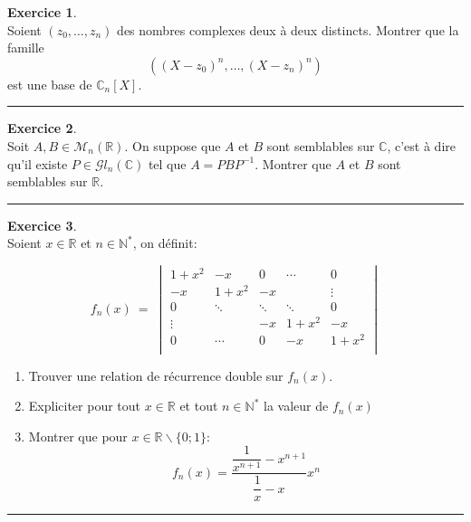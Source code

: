 \documentclass[a4paper,10pt]{article}
\theoremstyle{definition}
\theoremstyle{definition}
\newtheorem{exo}{Exercice}
\newcommand{\C}{\mathbb{C}}
\newcommand{\R}{\mathbb{R}}
\newcommand{\N}{\mathbb{N}}
\begin{document}
		\begin{exo}\quad\\[0.25cm]
			Soient $(z_0, \dots, z_n)$ des nombres complexes deux à deux distincts. Montrer que la famille 
			$$\left((X-z_0)^n, \dots , (X-z_n)^n\right)$$
			est une base de $\C_n[X]$.
			
			\centering
			\rule{1\linewidth}{0.6pt}
		\end{exo}
	
			\begin{exo}\quad\\[0.25cm]
		Soit $A,B\in \mathcal{M}_n(\R)$. On suppose que $A$ et $B$ sont semblables sur $\C$, c'est à dire qu'il existe $P\in \mathcal{G}l_n(\C)$ tel que $A=PBP^{-1}$. Montrer que $A$ et $B$ sont semblables sur $\R$.
		
		\centering
		\rule{1\linewidth}{0.6pt}
	\end{exo}
	
	\newpage
	 	
		\begin{exo}\quad\\[0.25cm]
			Soient $x\in \R$ et $n\in\N^*$, on définit:
			
			
			$$f_n(x) \ = \ \begin{vmatrix}
			1+x^2 & -x &0& \cdots & 0 \\
			-x & 1+x^2 &-x & & \vdots \\
			0 & \ddots &\ddots &\ddots & 0 \\
			\vdots &  & -x & 1+x^2 & -x \\
			0 & \cdots &0 & -x & 1+x^2 \\
			\end{vmatrix}$$
			\begin{enumerate}
				\item Trouver une relation de récurrence double sur $f_n(x)$.
				\item Expliciter pour tout $x\in \R$ et tout $n\in\N^*$ la valeur de $f_n(x)$
				\item Montrer que pour $x\in\R\backslash\{0;1\}$:
				$$f_n(x) =  \dfrac{\dfrac{1}{x^{n+1}}-x^{n+1}}{\dfrac{1}{x}-x}x^n$$ 
			\end{enumerate}
			\centering
			\rule{1\linewidth}{0.6pt}
		\end{exo}			
		
\end{document}
